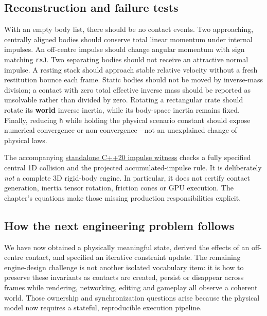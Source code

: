 \subsection{Reconstruction and failure tests}\label{02-foundations-ii-ch039-reconstruction-and-failure-tests}

With an empty body list, there should be no contact events. Two approaching, centrally aligned bodies should conserve total linear momentum under internal impulses. An off-centre impulse should change angular momentum with sign matching \texttt{r×J}. Two separating bodies should not receive an attractive normal impulse. A resting stack should approach stable relative velocity without a fresh restitution bounce each frame. Static bodies should not be moved by inverse-mass division; a contact with zero total effective inverse mass should be reported as unsolvable rather than divided by zero. Rotating a rectangular crate should rotate its \textbf{world} inverse inertia, while its body-space inertia remains fixed. Finally, reducing \texttt{h} while holding the physical scenario constant should expose numerical convergence or non-convergence---not an unexplained change of physical laws.

The accompanying \hyperref[source-file-128143bcbfc7213e97eaefa4]{standalone C++20 impulse witness} checks a fully specified central 1D collision and the projected accumulated-impulse rule. It is deliberately \emph{not} a complete 3D rigid-body engine. In particular, it does not certify contact generation, inertia tensor rotation, friction cones or GPU execution. The chapter's equations make those missing production responsibilities explicit.

\subsection{How the next engineering problem follows}\label{02-foundations-ii-ch039-how-the-next-engineering-problem-follows}

We have now obtained a physically meaningful state, derived the effects of an off-centre contact, and specified an iterative constraint update. The remaining engine-design challenge is not another isolated vocabulary item: it is how to preserve these invariants as contacts are created, persist or disappear across frames while rendering, networking, editing and gameplay all observe a coherent world. Those ownership and synchronization questions arise because the physical model now requires a stateful, reproducible execution pipeline.

